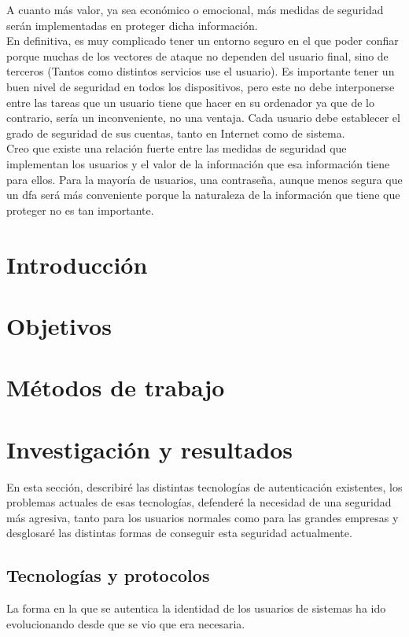 \documentclass[titlepage, 12pt, a4paper]{article}
\begin{document}
A cuanto más valor, ya sea económico o emocional, más medidas de seguridad serán implementadas en proteger dicha información.\\En definitiva, es muy complicado tener un entorno seguro en el que poder confiar porque muchas de los vectores de ataque no dependen del usuario final, sino de terceros (Tantos como distintos servicios use el usuario). Es importante tener un buen nivel de seguridad en todos los dispositivos, pero este no debe interponerse entre las tareas que un usuario tiene que hacer en su ordenador ya que de lo contrario, sería un inconveniente, no una ventaja. Cada usuario debe establecer el grado de seguridad de sus cuentas, tanto en Internet como de sistema.\\Creo que existe una relación fuerte entre las medidas de seguridad que implementan los usuarios y el valor de la información que esa información tiene para ellos. Para la mayoría de usuarios, una contraseña, aunque menos segura que un \Gls{dfa} será más conveniente porque la naturaleza de la información que tiene que proteger no es tan importante.
\section{Introducción}
\section{Objetivos}
\section{Métodos de trabajo}
\section{Investigación y resultados}
En esta sección, describiré las distintas tecnologías de autenticación existentes, los problemas actuales de esas tecnologías, defenderé la necesidad de una seguridad más agresiva, tanto para los usuarios normales como para las grandes empresas y desglosaré las distintas formas de conseguir esta seguridad actualmente.
\subsection{Tecnologías y protocolos}
La forma en la que se autentica la identidad de los usuarios de sistemas ha ido evolucionando desde que se vio que era necesaria.
\end{document}
